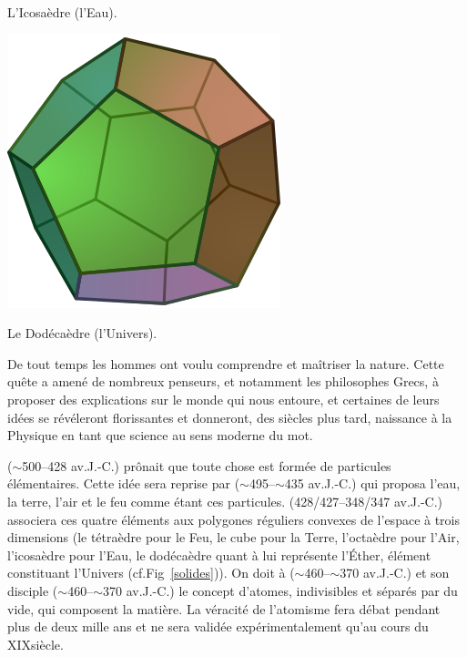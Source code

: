 {\vspace*{-0.25cm}
\begin{center}\normalfont\small {L'Icosaèdre (l'Eau).}\end{center}
\vspace*{-0.25cm}
\includegraphics[width=0.25\marginparwidth]{SM/Dodecahedron.png}
\vspace*{-0.25cm}
\begin{center}\normalfont\small {Le Dodécaèdre (l'Univers).}\end{center}
\vspace*{-0.25cm}
\label{solides}
}
De tout temps les hommes ont voulu comprendre et maîtriser la nature. Cette quête a amené de nombreux penseurs, et notamment les philosophes Grecs, à proposer des explications sur le monde qui nous entoure, et certaines de leurs idées se révéleront florissantes et donneront, des siècles plus tard, naissance à la Physique en tant que science au sens moderne du mot. 

 ($\sim$\num{500}--\num{428} av.J.-C.) prônait que toute chose est formée de particules élémentaires. Cette idée sera reprise par  ($\sim$\num{495}--$\sim$\num{435} av.J.-C.) qui proposa l'eau, la terre, l'air et le feu comme étant ces particules.  (\num{428}/\num{427}--\num{348}/\num{347} av.J.-C.) associera ces quatre éléments aux polygones réguliers convexes de l'espace à trois dimensions (le tétraèdre pour le Feu, le cube pour la Terre, l'octaèdre pour l'Air, l'icosaèdre pour l'Eau, le dodécaèdre quant à lui représente l'Éther, élément constituant l'Univers (cf.Fig~\ref{solides})). On doit à  ($\sim$\num{460}--$\sim$\num{370} av.J.-C.) et son disciple  ($\sim$\num{460}--$\sim$\num{370} av.J.-C.) le concept d'atomes, indivisibles et séparés par du vide, qui composent la matière. La véracité de l'atomisme fera débat pendant plus de deux mille ans et ne sera validée expérimentalement qu'au cours du XIX\ieme siècle.


